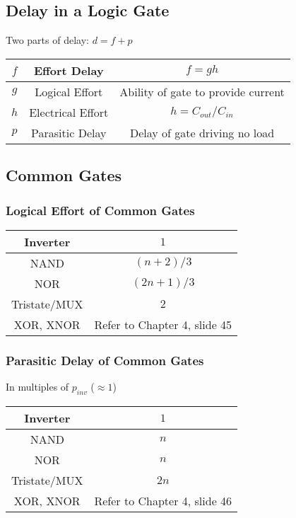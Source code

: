 \subsection{Delay in a Logic Gate}
Two parts of delay: $d = f + p$

\begin{tabular}{| c | c | c |}
    \hline
    $f$ & Effort Delay & $f = gh$\\
    \hline
    $g$ & Logical Effort & Ability of gate to provide current\\
    \hline
    $h$ & Electrical Effort & $h = C_{out}/C_{in}$\\
    \hline
    $p$ & Parasitic Delay & Delay of gate driving no load\\
    \hline
\end{tabular}

\subsection{Common Gates}
    \subsubsection{Logical Effort of Common Gates}
    \begin{tabular}{| c | c |}
        \hline
        Inverter & $1$\\
        \hline
        NAND & $(n + 2)/3$\\
        \hline
        NOR & $(2n + 1)/3$\\
        \hline
        Tristate/MUX& $2$\\
        \hline
        XOR, XNOR& Refer to Chapter 4, slide 45\\
        \hline        
    \end{tabular}

    \subsubsection{Parasitic Delay of Common Gates}
    In multiples of $p_{inv}$ ($\approx 1$)

    \begin{tabular}{| c | c |}
        \hline
        Inverter & $1$\\
        \hline
        NAND & $n$\\
        \hline
        NOR & $n$\\
        \hline
        Tristate/MUX& $2n$\\
        \hline
        XOR, XNOR& Refer to Chapter 4, slide 46\\
        \hline        
    \end{tabular}

